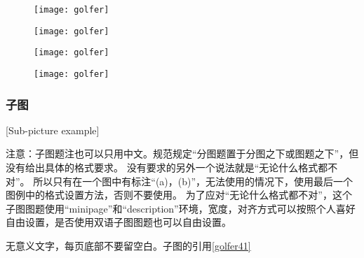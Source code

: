 \begin{figure}[htbp]
	\centering
	\begin{minipage}[t]{0.4\textwidth}
		\centering
		\texttt{[image: golfer]}
	\end{minipage}
	\centering
	\begin{minipage}[t]{0.4\textwidth}
		\centering
		\texttt{[image: golfer]}
	\end{minipage}
\end{figure}

\begin{figure}[htbp]
	\centering
	\begin{minipage}[t]{0.4\textwidth}
		\centering
		\texttt{[image: golfer]}
	\end{minipage}
	\centering
	\begin{minipage}[t]{0.4\textwidth}
		\centering
		\texttt{[image: golfer]}
	\end{minipage}
\end{figure}

\subsubsection{子图}[Sub-picture example]

注意：子图题注也可以只用中文。规范规定“分图题置于分图之下或图题之下”，但没有给出具体的格式要求。
没有要求的另外一个说法就是“无论什么格式都不对”。
所以只有在一个图中有标注“(a)，(b)”，无法使用的情况下，使用最后一个图例中的格式设置方法，否则不要使用。
为了应对“无论什么格式都不对”，这个子图图题使用“minipage”和“description”环境，宽度，对齐方式可以按照个人喜好自由设置，是否使用双语子图图题也可以自由设置。

\lipsum[1-3]

无意义文字，每页底部不要留空白。子图的引用\ref{golfer41}

\lipsum[4-5]

